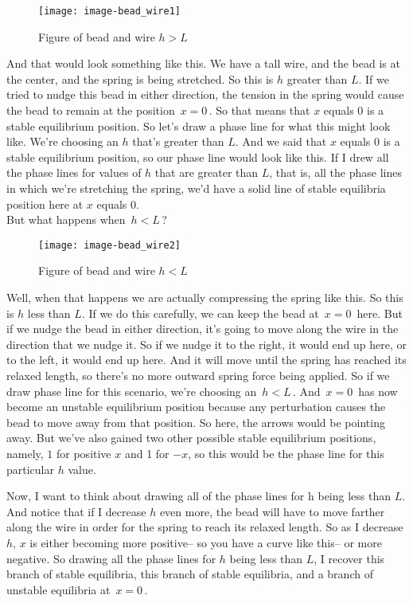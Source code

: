 \begin{wrapfigure}{r}{5.5cm}
  \texttt{[image: image-bead\_wire1]}
  \caption{Figure of bead and wire $h > L$}
\end{wrapfigure}

And that would look something like this.
We have a tall wire, and the bead is at the center,
and the spring is being stretched.
So this is $h$ greater than $L$.
If we tried to nudge this bead in either direction, the tension in the spring would cause the bead
to remain at the position $\, x  = 0 \,$.
So that means that $x$ equals $0$ is a stable equilibrium position.
So let's draw a phase line for what this might look like.
We're choosing an $h$ that's greater than $L$.
And we said that $x$ equals $0$ is a stable equilibrium position,
so our phase line would look like this. 
If I drew all the phase lines for values of $h$ that are greater than $L$, that is,
all the phase lines in which we're stretching the spring,
we'd have a solid line of stable equilibria position here at $x$ equals $0$.\\

But what happens when $\, h < L\,$?

\begin{wrapfigure}{r}{5.5cm}
  \texttt{[image: image-bead\_wire2]}
  \caption{Figure of bead and wire $h < L$}
\end{wrapfigure}

Well, when that happens we are actually
compressing the spring like this.
So this is $h$ less than $L$. If we do this carefully,
we can keep the bead at $\,x  = 0\,$ here.
But if we nudge the bead in either direction, it's going to move along the wire in the direction
that we nudge it.
So if we nudge it to the right, it would end up here, or to the left, it would end up here.
And it will move until the spring has reached
its relaxed length, so there's no more outward spring
force being applied.
So if we draw phase line for this scenario,
we're choosing an $\, h <  L\,$. And $\, x = 0 \, $ has now become an unstable equilibrium position
because any perturbation causes the bead to move away from that position.
So here, the arrows would be pointing away.
But we've also gained two other possible stable equilibrium
positions, namely, $1$ for positive $x$ and 1 for $- x$, so this would be the phase line
for this particular $h$ value.

Now, I want to think about drawing all of the phase
lines for h being less than $L$. And notice that if I decrease $h$ even more,
the bead will have to move farther along the wire in order for the spring
to reach its relaxed length.
So as I decrease $h,\, x$ is either becoming more positive--
so you have a curve like this-- or more negative.
So drawing all the phase lines for $h$ being less than $L$,
I recover this branch of stable equilibria, this branch of stable equilibria,
and a branch of unstable equilibria at $\, x = 0 \,$. \\

